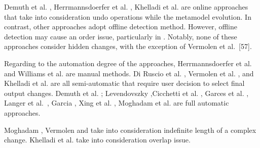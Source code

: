 Demuth et al. \cite{demuth2015constraint}, Herrmannsdoerfer et al. \cite{herrmannsdoerfer2009cope}, Khelladi et al. \cite{khelladi2016detecting} are online approaches that take into consideration undo operations while the metamodel evolution.
In contrast, other approaches \cite{williams2012searching,10.1145/2000410.2000416,levendovszky2014semi,garces2009managing,cicchetti_managing_2009,langer_posteriori_2013,garcia2012model,xing2006refactoring,moghadam2012automated,vermolen_reconstructing_2012} adopt offline detection method. However,  offline detection may cause an order issue, particularly in \cite{williams2012searching,10.1145/2000410.2000416,levendovszky2014semi,garces2009managing,langer_posteriori_2013,garcia2012model,xing2006refactoring,moghadam2012automated}. Notably, none of these approaches consider hidden changes, with the exception of Vermolen et al.~[57].


Regarding to the automation degree of the approaches, Herrmannsdoerfer et al. \cite{herrmannsdoerfer2009cope} and
Williams et al. \cite{williams2012searching} are manual methods. Di Ruscio et al. \cite{10.1145/2000410.2000416}, Vermolen et al. \cite{vermolen_reconstructing_2012}, and Khelladi et al. \cite{khelladi2016detecting} are all semi-automatic that require user decision to select final output changes.
Demuth et al. \cite{demuth2015constraint}; Levendovszky \cite{levendovszky2014semi},Cicchetti et al. \cite{cicchetti_managing_2009}, Garces et al. \cite{garces2009managing}, Langer et al.~\cite{langer_posteriori_2013}, Garcia \cite{garcia2012model}, Xing  et al. \cite{xing2006refactoring}, Moghadam et al. \cite{moghadam2012automated} are full automatic approaches.




Moghadam \cite{moghadam2012automated}, Vermolen \cite{vermolen_reconstructing_2012} and \cite{khelladi2016detecting} take into consideration indefinite length of a complex change.
Khelladi et al. \cite{khelladi2016detecting} take into consideration overlap issue.



